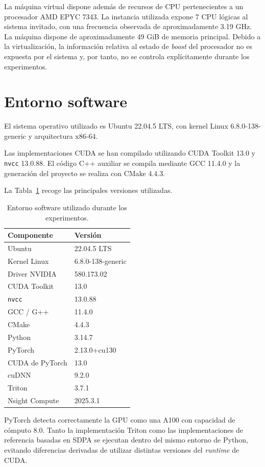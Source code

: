 La máquina virtual dispone además de recursos de CPU pertenecientes a un procesador AMD EPYC 7343. La instancia utilizada expone 7 CPU lógicas al sistema invitado, con una frecuencia observada de aproximadamente 3.19 GHz. La máquina dispone de aproximadamente 49 GiB de memoria principal. Debido a la virtualización, la información relativa al estado de \textit{boost} del procesador no es expuesta por el sistema y, por tanto, no se controla explícitamente durante los experimentos.

\section{Entorno software}

El sistema operativo utilizado es Ubuntu 22.04.5 LTS, con kernel Linux 6.8.0-138-generic y arquitectura x86-64.

Las implementaciones CUDA se han compilado utilizando CUDA Toolkit 13.0 y \texttt{nvcc} 13.0.88. El código C++ auxiliar se compila mediante GCC 11.4.0 y la generación del proyecto se realiza con CMake 4.4.3.

La Tabla~\ref{tab:software_entorno} recoge las principales versiones utilizadas.

\begin{table}[H]
\centering
\caption{Entorno software utilizado durante los experimentos.}
\label{tab:software_entorno}
\begin{tabular}{ll}
\hline
\textbf{Componente} & \textbf{Versión} \\
\hline
Ubuntu & 22.04.5 LTS \\
Kernel Linux & 6.8.0-138-generic \\
Driver NVIDIA & 580.173.02 \\
CUDA Toolkit & 13.0 \\
\texttt{nvcc} & 13.0.88 \\
GCC / G++ & 11.4.0 \\
CMake & 4.4.3 \\
Python & 3.14.7 \\
PyTorch & 2.13.0+cu130 \\
CUDA de PyTorch & 13.0 \\
cuDNN & 9.2.0 \\
Triton & 3.7.1 \\
Nsight Compute & 2025.3.1 \\
\hline
\end{tabular}
\end{table}

PyTorch detecta correctamente la GPU como una A100 con capacidad de cómputo 8.0. Tanto la implementación Triton como las implementaciones de referencia basadas en SDPA se ejecutan dentro del mismo entorno de Python, evitando diferencias derivadas de utilizar distintas versiones del \textit{runtime} de CUDA.

